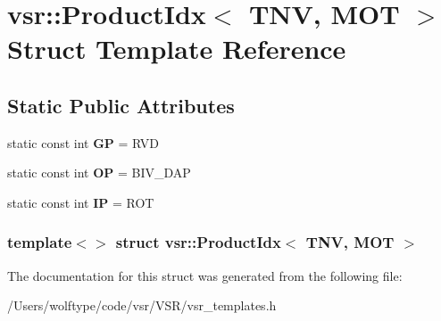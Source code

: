 \hypertarget{structvsr_1_1_product_idx_3_01_t_n_v_00_01_m_o_t_01_4}{\section{vsr\-:\-:Product\-Idx$<$ T\-N\-V, M\-O\-T $>$ Struct Template Reference}
\label{structvsr_1_1_product_idx_3_01_t_n_v_00_01_m_o_t_01_4}
}
\subsection*{Static Public Attributes}
\begin{DoxyCompactItemize}
\item 
\hypertarget{structvsr_1_1_product_idx_3_01_t_n_v_00_01_m_o_t_01_4_a4fce05362c43a116c23605625aa9f6cf}{static const int {\bfseries G\-P} = R\-V\-D}\label{structvsr_1_1_product_idx_3_01_t_n_v_00_01_m_o_t_01_4_a4fce05362c43a116c23605625aa9f6cf}

\item 
\hypertarget{structvsr_1_1_product_idx_3_01_t_n_v_00_01_m_o_t_01_4_af618ab664552d851043ecb679a45ab84}{static const int {\bfseries O\-P} = B\-I\-V\-\_\-\-D\-A\-P}\label{structvsr_1_1_product_idx_3_01_t_n_v_00_01_m_o_t_01_4_af618ab664552d851043ecb679a45ab84}

\item 
\hypertarget{structvsr_1_1_product_idx_3_01_t_n_v_00_01_m_o_t_01_4_a3cf113c6c46bc9a7fba98392d1da18b6}{static const int {\bfseries I\-P} = R\-O\-T}\label{structvsr_1_1_product_idx_3_01_t_n_v_00_01_m_o_t_01_4_a3cf113c6c46bc9a7fba98392d1da18b6}

\end{DoxyCompactItemize}
\subsubsection*{template$<$$>$ struct vsr\-::\-Product\-Idx$<$ T\-N\-V, M\-O\-T $>$}



The documentation for this struct was generated from the following file\-:\begin{DoxyCompactItemize}
\item 
/\-Users/wolftype/code/vsr/\-V\-S\-R/vsr\-\_\-templates.\-h\end{DoxyCompactItemize}
